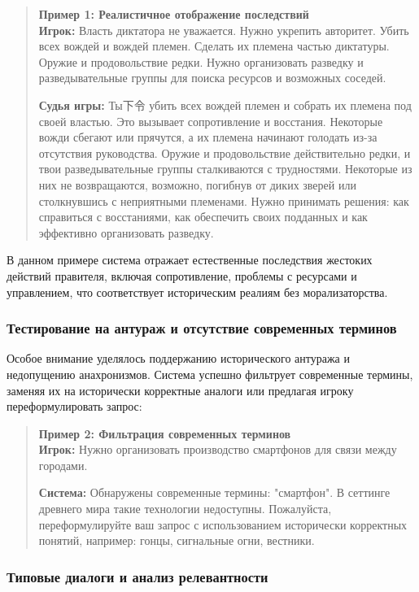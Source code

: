 \begin{quote}
\textbf{Пример 1: Реалистичное отображение последствий}\\
\textbf{Игрок:} Власть диктатора не уважается. Нужно укрепить авторитет. Убить всех вождей и вождей племен. Сделать их племена частью диктатуры. Оружие и продовольствие редки. Нужно организовать разведку и разведывательные группы для поиска ресурсов и возможных соседей.

\textbf{Судья игры:} Ты下令 убить всех вождей племен и собрать их племена под своей властью. Это вызывает сопротивление и восстания. Некоторые вожди сбегают или прячутся, а их племена начинают голодать из-за отсутствия руководства. Оружие и продовольствие действительно редки, и твои разведывательные группы сталкиваются с трудностями. Некоторые из них не возвращаются, возможно, погибнув от диких зверей или столкнувшись с неприятными племенами. Нужно принимать решения: как справиться с восстаниями, как обеспечить своих подданных и как эффективно организовать разведку.
\end{quote}

В данном примере система отражает естественные последствия жестоких действий правителя, включая сопротивление, проблемы с ресурсами и управлением, что соответствует историческим реалиям без морализаторства.

\subsubsection{Тестирование на антураж и отсутствие современных терминов}

Особое внимание уделялось поддержанию исторического антуража и недопущению анахронизмов. Система успешно фильтрует современные термины, заменяя их на исторически корректные аналоги или предлагая игроку переформулировать запрос:

\begin{quote}
\textbf{Пример 2: Фильтрация современных терминов}\\
\textbf{Игрок:} Нужно организовать производство смартфонов для связи между городами.

\textbf{Система:} Обнаружены современные термины: "{}смартфон"{}. В сеттинге древнего мира такие технологии недоступны. Пожалуйста, переформулируйте ваш запрос с использованием исторически корректных понятий, например: гонцы, сигнальные огни, вестники.
\end{quote}

\subsubsection{Типовые диалоги и анализ релевантности}

